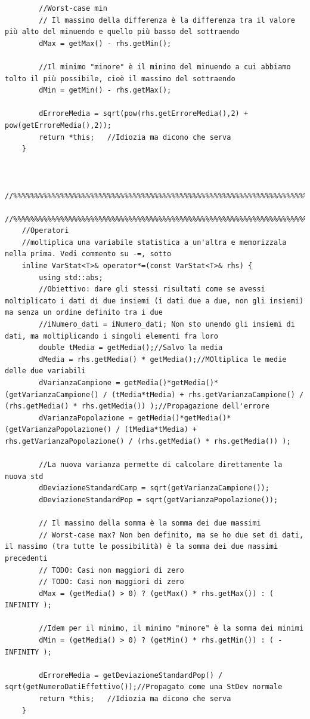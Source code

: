 \documentclass[12pt]{article} %
\begin{document}
\begin{verbatim}
		//Worst-case min
		// Il massimo della differenza è la differenza tra il valore più alto del minuendo e quello più basso del sottraendo
		dMax = getMax() - rhs.getMin();

		//Il minimo "minore" è il minimo del minuendo a cui abbiamo tolto il più possibile, cioè il massimo del sottraendo
		dMin = getMin() - rhs.getMax();

		dErroreMedia = sqrt(pow(rhs.getErroreMedia(),2) + pow(getErroreMedia(),2));
		return *this;	//Idiozia ma dicono che serva
	}


	//%%%%%%%%%%%%%%%%%%%%%%%%%%%%%%%%%%%%%%%%%%%%%%%%%%%%%%%%%%%%%%%%%%%%%%%%%%%%%%%%%%%%%%%%%%%%%%%%%%%%%%%
	//%%%%%%%%%%%%%%%%%%%%%%%%%%%%%%%%%%%%%%%%%%%%%%%%%%%%%%%%%%%%%%%%%%%%%%%%%%%%%%%%%%%%%%%%%%%%%%%%%%%%%%%
	//Operatori
	//moltiplica una variabile statistica a un'altra e memorizzala nella prima. Vedi commento su -=, sotto
	inline VarStat<T>& operator*=(const VarStat<T>& rhs) {
		using std::abs;
		//Obiettivo: dare gli stessi risultati come se avessi moltiplicato i dati di due insiemi (i dati due a due, non gli insiemi) ma senza un ordine definito tra i due
		//iNumero_dati = iNumero_dati; Non sto unendo gli insiemi di dati, ma moltiplicando i singoli elementi fra loro
		double tMedia = getMedia();//Salvo la media
		dMedia = rhs.getMedia() * getMedia();//MOltiplica le medie delle due variabili
		dVarianzaCampione = getMedia()*getMedia()*(getVarianzaCampione() / (tMedia*tMedia) + rhs.getVarianzaCampione() / (rhs.getMedia() * rhs.getMedia()) );//Propagazione dell'errore
		dVarianzaPopolazione = getMedia()*getMedia()*(getVarianzaPopolazione() / (tMedia*tMedia) + rhs.getVarianzaPopolazione() / (rhs.getMedia() * rhs.getMedia()) );

		//La nuova varianza permette di calcolare direttamente la nuova std
		dDeviazioneStandardCamp = sqrt(getVarianzaCampione());
		dDeviazioneStandardPop = sqrt(getVarianzaPopolazione());

		// Il massimo della somma è la somma dei due massimi
		// Worst-case max? Non ben definito, ma se ho due set di dati, il massimo (tra tutte le possibilità) è la somma dei due massimi precedenti
		// TODO: Casi non maggiori di zero
		// TODO: Casi non maggiori di zero
		dMax = (getMedia() > 0) ? (getMax() * rhs.getMax()) : ( INFINITY );

		//Idem per il minimo, il minimo "minore" è la somma dei minimi
		dMin = (getMedia() > 0) ? (getMin() * rhs.getMin()) : ( -INFINITY );

		dErroreMedia = getDeviazioneStandardPop() / sqrt(getNumeroDatiEffettivo());//Propagato come una StDev normale
		return *this;	//Idiozia ma dicono che serva
	}


\end{verbatim}
\end{document}
